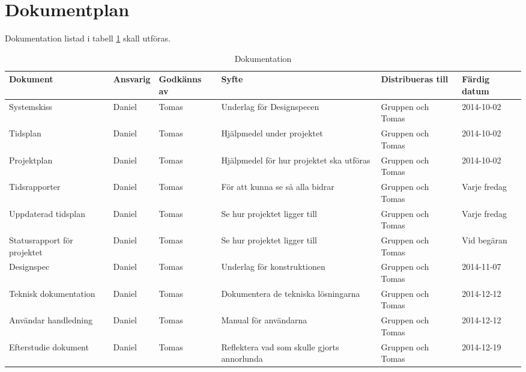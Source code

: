 \section{Dokumentplan}
Dokumentation listad i tabell \ref{dokumentation:tabell} skall utföras.

\begin{table}[h]
	\centering
		\begin{tabularx}{\textwidth}{| p{22mm} | l | X | p{25mm} | X | l |}
			\hline
	\textbf{Dokument} & \textbf{Ansvarig} & \textbf{Godkänns av} & \textbf{Syfte} & \textbf{Distribueras till} & \textbf{Färdig datum} \\
			\hline

     {Systemskiss} & {Daniel} & {Tomas}& {Underlag för Designspecen} & {Gruppen och Tomas} & {2014-10-02} \\
      \hline
          {Tidsplan} & {Daniel} & {Tomas}& {Hjälpmedel under projektet} & {Gruppen och Tomas} & {2014-10-02} \\
      \hline
          {Projektplan} & {Daniel} & {Tomas}& {Hjälpmedel för hur projektet ska utföras} & {Gruppen och Tomas} & {2014-10-02} \\
      \hline
          {Tidsrapporter} & {Daniel} & {Tomas}& {För att kunna se så alla bidrar} & {Gruppen och Tomas} & {Varje fredag} \\
      \hline
                {Uppdaterad tidsplan} & {Daniel} & {Tomas}& {Se hur projektet ligger till} & {Gruppen och Tomas} & {Varje fredag} \\
      \hline
                      {Statusrapport för projektet} & {Daniel} & {Tomas}& {Se hur projektet ligger till} & {Gruppen och Tomas} & {Vid begäran} \\
      \hline
      
                {Designspec} & {Daniel} & {Tomas}& {Underlag för konstruktionen} & {Gruppen och Tomas} & {2014-11-07} \\
      \hline
                      {Teknisk 
                      dokumentation} & {Daniel} & {Tomas}& {Dokumentera de tekniska lösningarna} & {Gruppen och Tomas} & {2014-12-12} \\
      \hline
                            {Användar
                            handledning} & {Daniel} & {Tomas}& {Manual för användarna} & {Gruppen och Tomas} & {2014-12-12} \\
      \hline
  {Efterstudie
  dokument} & {Daniel} & {Tomas}& {Reflektera vad som skulle gjorts annorlunda} & {Gruppen och Tomas} & {2014-12-19} \\
      \hline
      
		\end{tabularx}
	\caption{Dokumentation} \label{dokumentation:tabell}
\end{table}